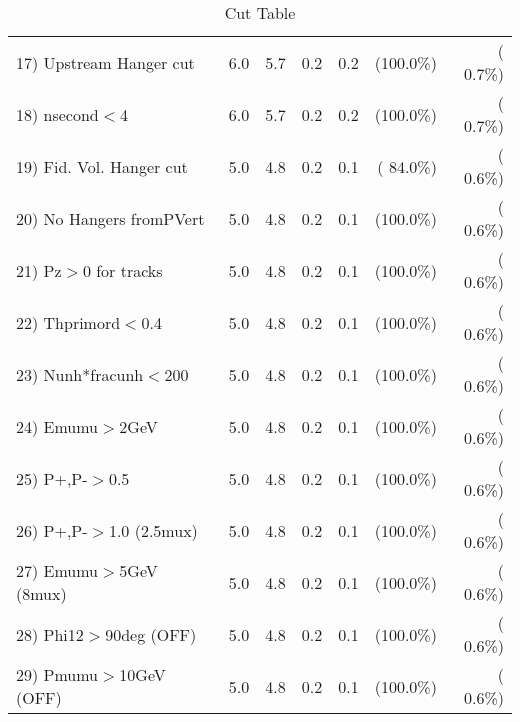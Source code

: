 \begin{table}[h!]
\begin{tabular}{||l||r|r|r|r|r|r||}
 17) Upstream Hanger cut  &          6.0 &          5.7 &          0.2 &          0.2 & (100.0\%) & (  0.7\%) \\
 18) nsecond$<$4          &          6.0 &          5.7 &          0.2 &          0.2 & (100.0\%) & (  0.7\%) \\
 19) Fid. Vol. Hanger cut &          5.0 &          4.8 &          0.2 &          0.1 & ( 84.0\%) & (  0.6\%) \\
 20) No Hangers fromPVert &          5.0 &          4.8 &          0.2 &          0.1 & (100.0\%) & (  0.6\%) \\
 21) Pz$>$0 for tracks    &          5.0 &          4.8 &          0.2 &          0.1 & (100.0\%) & (  0.6\%) \\
 22) Thprimord$<$0.4      &          5.0 &          4.8 &          0.2 &          0.1 & (100.0\%) & (  0.6\%) \\
 23) Nunh*fracunh$<$200   &          5.0 &          4.8 &          0.2 &          0.1 & (100.0\%) & (  0.6\%) \\
 24) Emumu$>$2GeV         &          5.0 &          4.8 &          0.2 &          0.1 & (100.0\%) & (  0.6\%) \\
 25) P+,P-$>$0.5          &          5.0 &          4.8 &          0.2 &          0.1 & (100.0\%) & (  0.6\%) \\
 26) P+,P-$>$1.0 (2.5mux) &          5.0 &          4.8 &          0.2 &          0.1 & (100.0\%) & (  0.6\%) \\
 27) Emumu$>$5GeV  (8mux) &          5.0 &          4.8 &          0.2 &          0.1 & (100.0\%) & (  0.6\%) \\
 28) Phi12$>$90deg  (OFF) &          5.0 &          4.8 &          0.2 &          0.1 & (100.0\%) & (  0.6\%) \\
 29) Pmumu$>$10GeV  (OFF) &          5.0 &          4.8 &          0.2 &          0.1 & (100.0\%) & (  0.6\%) \\
 \hline
 \hline
 \end{tabular}
 \caption{Cut Table           }
 \label{tab-cutcohjpsi-mumu_cohrho0}
 \end{table}

